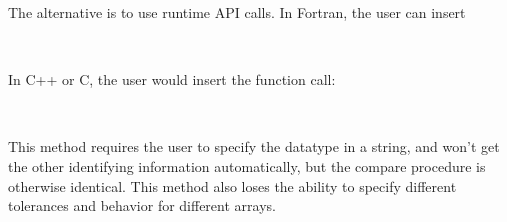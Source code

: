 The alternative is to use runtime API calls.
In Fortran, the user can insert
\begin{otabbing}
\> \\
\>
\end{otabbing}
In C++ or C, the user would insert the function call:
\begin{otabbing}
\> \\
\>
\end{otabbing}
This method requires the user to specify the datatype in a string, and won't get the other identifying information automatically, but the compare procedure is otherwise identical.
This method also loses the ability to specify different tolerances and behavior for different arrays.

